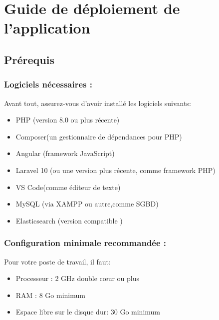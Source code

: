 \documentclass[12pt]{article}
\begin{document}
\vspace{0.5cm}


\newpage
{\fontsize{14}{16}\section*{Guide de déploiement de l’application}}
\setcounter{subsection}{0} %
\renewcommand\thesubsection{\arabic{subsection}}

\bigskip

\subsection{Prérequis}
\medskip
\subsubsection{Logiciels nécessaires :}
\setcounter{subsubsection}{1}

Avant tout, assurez-vous d'avoir installé les logiciels suivants:

\begin{itemize}[label=--]
    \item PHP (version 8.0 ou plus récente)
    \item Composer(un gestionnaire de dépendances pour PHP)
    \item Angular (framework JavaScript)
    \item Laravel 10 (ou une version plus récente, comme framework PHP)
    \item VS Code(comme éditeur de texte)
    \item MySQL (via XAMPP ou autre,comme SGBD)
    \item Elasticsearch (version compatible )  
\end{itemize}

\subsubsection{Configuration minimale recommandée :}
Pour votre poste de travail, il faut:
\begin{itemize}[label=--]
    \item Processeur : 2 GHz double cœur ou plus
    \item RAM : 8 Go minimum
    \item Espace libre sur le disque dur: 30 Go minimum
\end{itemize}
\end{document}
